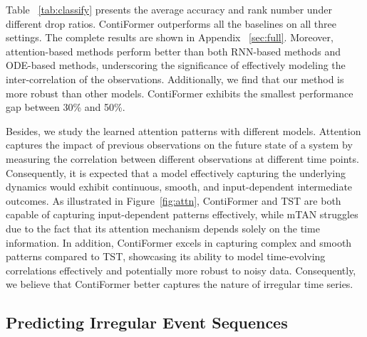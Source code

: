 \documentclass{article}
\begin{document}
Table ~\ref{tab:classify} presents the average accuracy and rank number under different drop ratios. 
ContiFormer outperforms all the baselines on all three settings. The complete results are shown in Appendix ~\ref{sec:full}. 
Moreover, attention-based methods perform better than both RNN-based methods and ODE-based methods, underscoring the significance of effectively modeling the inter-correlation of the observations.
Additionally, we find that our method is more robust than other models. 
ContiFormer exhibits the smallest performance gap between 30\% and 50\%. 

Besides, we study the learned attention patterns with different models. 
Attention captures the impact of previous observations on the future state of a system by measuring the correlation between different observations at different time points. Consequently, it is expected that a model effectively capturing the underlying dynamics would exhibit continuous, smooth, and input-dependent intermediate outcomes. As illustrated in Figure~\ref{fig:attn}, 
ContiFormer and TST are both capable of capturing input-dependent patterns effectively, while mTAN struggles due to the fact that its attention mechanism depends solely on the time information.
In addition, ContiFormer excels in capturing complex and smooth patterns compared to TST, showcasing its ability to model time-evolving correlations effectively and potentially more robust to noisy data. 
Consequently, we believe that ContiFormer better captures the nature of irregular time series.

\subsection{Predicting Irregular Event Sequences} \label{piel}
\end{document}
